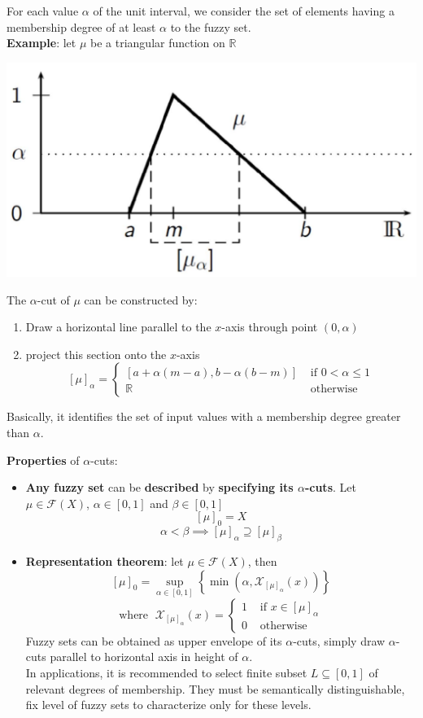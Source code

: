 \documentclass[11pt]{article}
\begin{document}
		For each value $\alpha$ of the unit interval, we consider the set of elements having a membership degree of at least $\alpha$ to the fuzzy set.\\
		
		\textbf{Example}: let $\mu$ be a triangular function on $\mathbb{R}$
		\begin{center}
			\includegraphics[width=0.45\columnwidth]{img/FS/hr1}
		\end{center}
		The $\alpha$-cut of $\mu$ can be constructed by: 
		\begin{enumerate}
			\item Draw a horizontal line parallel to the $x$-axis through point $(0, \alpha)$
			\item project this section onto the $x$-axis
			$$ [\mu]_\alpha = \begin{cases}
				[a + \alpha(m-a), b - \alpha (b-m)] & \text{ if } 0 < \alpha \leq 1 \\
				\mathbb{R} & \text{ otherwise }
			\end{cases}$$
		\end{enumerate}
		Basically, it identifies the set of input values with a membership degree greater than $\alpha$.\\
		
		\newpage
		
		\textbf{Properties} of $\alpha$-cuts: 
		\begin{itemize}
			\item \textbf{Any fuzzy set} can be \textbf{described} by \textbf{specifying its $\alpha$-cuts}. Let $\mu \in \mathcal{F} (X)$, $\alpha \in [0,1]$ and $\beta \in [0,1]$
			$$ [\mu]_0 = X$$
			$$ \alpha < \beta \implies [\mu]_\alpha \supseteq [\mu]_\beta $$
			\nn
			
			\item \textbf{Representation theorem}: let $\mu \in \mathcal{F} (X)$, then 
			$$ [\mu]_0 = \sup_{\alpha \in [0,1]} \left\{\min\left(\alpha, \mathcal{X}_{[\mu]_\alpha} (x)\right) \right\} $$
			$$ \text{where }\; \mathcal{X}_{[\mu]_\alpha} (x) = \begin{cases}
				1 & \text{ if } x \in [\mu]_\alpha \\
				0 & \text{ otherwise }
			\end{cases}$$
			Fuzzy sets can be obtained as upper envelope of its $\alpha$-cuts, simply draw $\alpha$-cuts parallel to horizontal axis in height of $\alpha$.\\
			In applications, it is recommended to select finite subset $L \subseteq [0,1]$ of relevant degrees of membership. They must be semantically distinguishable, fix level of fuzzy sets to characterize only for these levels.\\
		\end{itemize}
		
\end{document}
